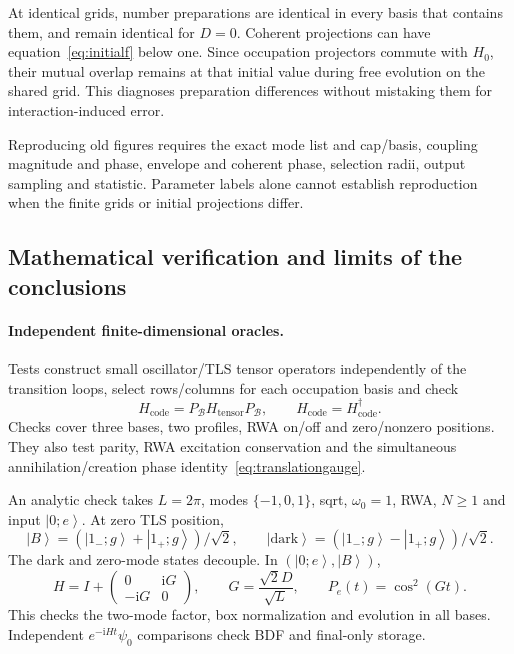 \documentclass[11pt,a4paper]{article}
\newcommand{\ket}[1]{\left|#1\right\rangle}
\newcommand{\ii}{\mathrm{i}}
\newcommand{\B}{\mathcal B}
\begin{document}
At identical grids, number preparations are identical in every basis that
contains them, and remain identical for $D=0$. Coherent projections can
have equation~\eqref{eq:initialf} below one. Since occupation projectors
commute with $H_0$, their mutual overlap remains at that initial value during
free evolution on the shared grid. This diagnoses preparation differences
without mistaking them for interaction-induced error.

Reproducing old figures requires the exact mode list and cap/basis, coupling
magnitude and phase, envelope and coherent phase, selection radii, output
sampling and statistic. Parameter labels alone cannot establish reproduction
when the finite grids or initial projections differ.

\subsection{Mathematical verification and limits of the conclusions}
\paragraph{Independent finite-dimensional oracles.}
Tests construct small oscillator/TLS tensor operators independently of the
transition loops, select rows/columns for each occupation basis and check
\begin{equation}
 H_{\mathrm{code}}=P_\B H_{\mathrm{tensor}}P_\B,
 \qquad H_{\mathrm{code}}=H_{\mathrm{code}}^\dagger.
 \label{eq:tensorcheck}
\end{equation}
Checks cover three bases, two profiles, RWA on/off and zero/nonzero positions.
They also test parity, RWA excitation conservation and the simultaneous
annihilation/creation phase identity~\eqref{eq:translationgauge}.

An analytic check takes $L=2\pi$, modes $\{-1,0,1\}$, sqrt,
$\omega_0=1$, RWA, $N\geq1$ and input $\ket{0;e}$. At zero TLS position,
\begin{equation}
 \ket B=(\ket{1_-;g}+\ket{1_+;g})/\sqrt2,\qquad
 \ket{\mathrm{dark}}=(\ket{1_-;g}-\ket{1_+;g})/\sqrt2.
\end{equation}
The dark and zero-mode states decouple. In $(\ket{0;e},\ket B)$,
\begin{equation}
 H=I+\begin{pmatrix}0&\ii G\\-\ii G&0\end{pmatrix},\qquad
 G=\frac{\sqrt2D}{\sqrt L},\qquad P_e(t)=\cos^2(Gt).
 \label{eq:rabioracle}
\end{equation}
This checks the two-mode factor, box normalization and evolution in all bases.
Independent $e^{-\ii Ht}\psi_0$ comparisons check BDF and final-only storage.
\end{document}

